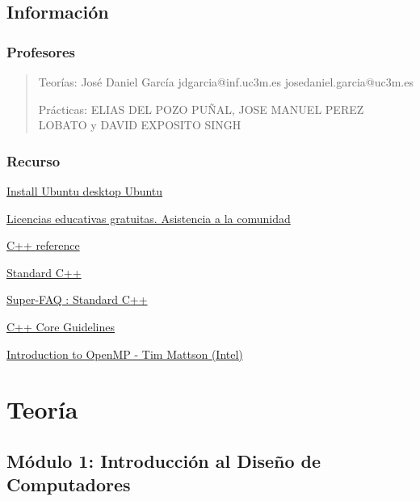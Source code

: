 \documentclass[12pt, twoside, openright]{report} %
\begin{document}
\listoffigures
\thispagestyle{fancy}





\chapter{Información}
\section{Profesores}
\begin{quote}
  Teorías: José Daniel García jdgarcia@inf.uc3m.es
  josedaniel.garcia@uc3m.es 
  
  Prácticas: ELIAS DEL POZO PUÑAL, JOSE MANUEL
  PEREZ LOBATO y DAVID EXPOSITO SINGH
\end{quote}

\section{Recurso}
\href{https://ubuntu.com/tutorials/install-ubuntu-desktop\#1-overview}{Install
Ubuntu desktop \textbar{} Ubuntu}

\href{https://www.jetbrains.com/es-es/community/education/\#students}{Licencias
educativas gratuitas. Asistencia a la comunidad}

\href{https://en.cppreference.com/w/cpp}{C++ reference}

\href{https://isocpp.org/}{Standard C++}

\href{https://isocpp.org/faq}{Super-FAQ : Standard C++}

\href{http://isocpp.github.io/CppCoreGuidelines/CppCoreGuidelines}{C++
Core Guidelines}

\href{https://www.youtube.com/playlist?list=PLLX-Q6B8xqZ8n8bwjGdzBJ25X2utwnoEG}{Introduction
to OpenMP - Tim Mattson (Intel)}


\part{Teoría}

  \chapter{Módulo 1: Introducción al Diseño de Computadores}
\end{document}
